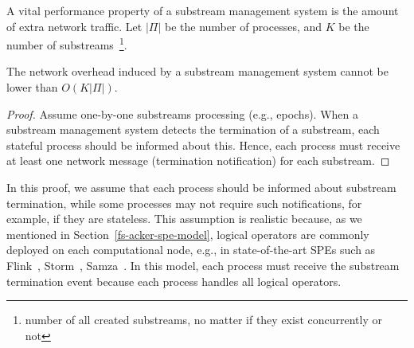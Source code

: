 A vital performance property of a substream management system is the amount of extra network traffic. Let $|\Pi|$ be the number of processes, and $K$ be the number of substreams~\footnote{number of all created substreams, no matter if they exist concurrently or not}. 

\begin{lemma}
The network overhead induced by a substream management system cannot be lower than $O(K|\Pi|)$. 
\end{lemma}
\begin{proof}
Assume one-by-one substreams processing (e.g., epochs). When a substream management system detects the termination of a substream, each stateful process should be informed about this. Hence, each process must receive at least one network message (termination notification) for each substream.
\end{proof}

In this proof, we assume that each process should be informed about substream termination, while some processes may not require such notifications, for example, if they are stateless. This assumption is realistic because, as we mentioned in Section~\ref{fs-acker-spe-model}, logical operators are commonly deployed on each computational node, e.g., in state-of-the-art SPEs such as Flink~\cite{Carbone:2017:SMA:3137765.3137777}, Storm~\cite{apache:storm}, Samza~\cite{Noghabi:2017:SSS:3137765.3137770}. In this model, each process must receive the substream termination event because each process handles all logical operators.